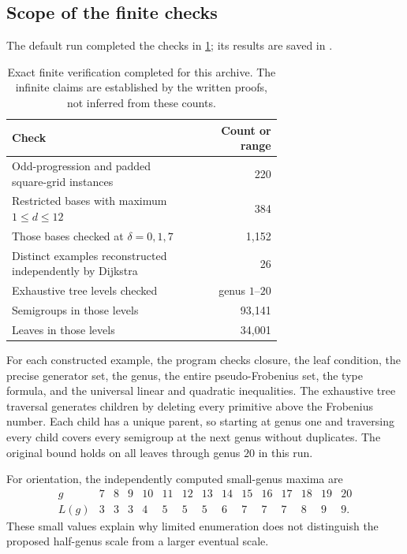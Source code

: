 \documentclass[11pt,letterpaper]{article}
\numberwithin{equation}{section}
\theoremstyle{definition}
\theoremstyle{remark}
\begin{document}
\subsection{Scope of the finite checks}

The default run completed the checks in \cref{tab:checks}; its results are saved
in .

\begin{table}[htbp]
\centering
\begin{tabular}{p{0.68\linewidth}r}
\toprule
Check & Count or range\\
\midrule
Odd-progression and padded square-grid instances & 220\\
Restricted bases with maximum $1\le d\le12$ & 384\\
Those bases checked at $\delta=0,1,7$ & 1,152\\
Distinct examples reconstructed independently by Dijkstra & 26\\
Exhaustive tree levels checked & genus $1$--$20$\\
Semigroups in those levels & 93,141\\
Leaves in those levels & 34,001\\
\bottomrule
\end{tabular}
\caption{Exact finite verification completed for this archive. The infinite
claims are established by the written proofs, not inferred from these counts.}
\label{tab:checks}
\end{table}

For each constructed example, the program checks closure, the leaf condition,
the precise generator set, the genus, the entire pseudo-Frobenius set, the
type formula, and the universal linear and quadratic inequalities.
The exhaustive tree traversal generates children by deleting every primitive
above the Frobenius number. Each child has a unique parent, so starting at
genus one and traversing every child covers every semigroup at the next
genus without duplicates. The original bound holds on all leaves through
genus $20$ in this run.

For orientation, the independently computed small-genus maxima are
\[
\begin{array}{c|rrrrrrrrrrrrrr}
 g&7&8&9&10&11&12&13&14&15&16&17&18&19&20\\\hline
 L(g)&3&3&3&4&5&5&5&6&7&7&7&8&9&9.
\end{array}
\]
These small values explain why limited enumeration does not distinguish the
proposed half-genus scale from a larger eventual scale.
\end{document}
